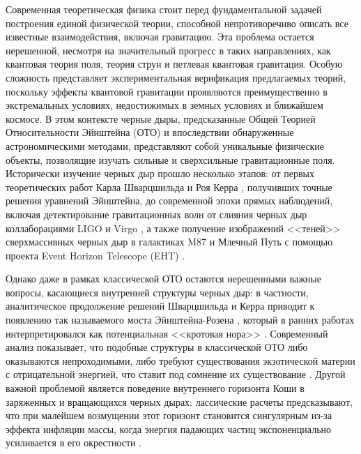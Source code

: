 
{\actuality} Современная теоретическая физика стоит перед фундаментальной задачей построения единой физической теории, способной непротиворечиво описать все известные взаимодействия, включая гравитацию. Эта проблема остается нерешенной, несмотря на значительный прогресс в таких направлениях, как квантовая теория поля, теория струн и петлевая квантовая гравитация. Особую сложность представляет экспериментальная верификация предлагаемых теорий, поскольку эффекты квантовой гравитации проявляются преимущественно в экстремальных условиях, недостижимых в земных условиях и ближайшем космосе. В этом контексте черные дыры, предсказанные Общей Теорией Относительности Эйнштейна (ОТО) и впоследствии обнаруженные астрономическими методами, представляют собой уникальные физические объекты, позволящие изучать  сильные и сверхсильные гравитационные поля. Исторически изучение черных дыр прошло несколько этапов: от первых теоретических работ Карла Шварцшильда и Роя Керра \cite{schwarzschild1916gravitationsfeld,kerr1963gravitational}, получивших точные решения уравнений Эйнштейна, до современной эпохи прямых наблюдений, включая детектирование гравитационных волн от слияния черных дыр коллаборациями LIGO и Virgo \cite{abbottObservationGravitationalWaves2016a}, а также получение изображений <<теней>> сверхмассивных черных дыр в галактиках M87 и Млечный Путь с помощью проекта Event Horizon Telescope (EHT) \cite{EHTSgrA2022, EHTM872019}.


Однако даже в рамках классической ОТО остаются нерешенными важные вопросы, касающиеся внутренней структуры черных дыр: в частности, аналитическое продолжение решений Шварцшильда и Керра приводит к появлению так называемого моста Эйнштейна-Розена \cite{einsteinParticleProblemGeneral1935}, который в ранних работах интерпретировался как потенциальная <<кротовая нора>> \cite{misnerClassicalPhysicsGeometry1957}. Современный анализ показывает, что подобные структуры в классической ОТО либо оказываются непроходимыми, либо требуют существования экзотической материи с отрицательной энергией, что ставит под сомнение их существование \cite{visserLorentzianWormholesEinstein1996}. Другой важной проблемой является поведение внутреннего горизонта Коши в заряженных и вращающихся черных дырах: лассические расчеты предсказывают, что при малейшем возмущении этот горизонт становится сингулярным из-за эффекта инфляции массы, когда энергия падающих частиц экспоненциально усиливается в его окрестности \cite{gurselEvolutionScalarPerturbations1979, gurselFinalStateEvolution1979, poissonEschatologyBlackHole1989, poissonInnerhorizonInstabilityMass1989, poissonInternalStructureBlack1990}. 

